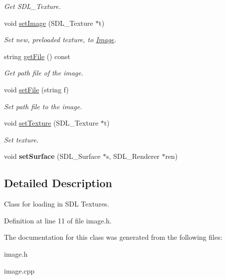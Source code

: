 \begin{DoxyCompactItemize}
\begin{DoxyCompactList}\small\item\em Get S\+D\+L\+\_\+\+Texture. \end{DoxyCompactList}\item 
void \hyperlink{classImage_af42b5d6a8abd90d67e9ae19e374520da}{set\+Image} (S\+D\+L\+\_\+\+Texture $\ast$t)\hypertarget{classImage_af42b5d6a8abd90d67e9ae19e374520da}{}\label{classImage_af42b5d6a8abd90d67e9ae19e374520da}

\begin{DoxyCompactList}\small\item\em Set new, preloaded texture, to \hyperlink{classImage}{Image}. \end{DoxyCompactList}\item 
string \hyperlink{classImage_aebc4cdd98961289324e6159b77ee3e69}{get\+File} () const \hypertarget{classImage_aebc4cdd98961289324e6159b77ee3e69}{}\label{classImage_aebc4cdd98961289324e6159b77ee3e69}

\begin{DoxyCompactList}\small\item\em Get path file of the image. \end{DoxyCompactList}\item 
void \hyperlink{classImage_ab4030489c65a25b2e0c458acac0ca94e}{set\+File} (string f)\hypertarget{classImage_ab4030489c65a25b2e0c458acac0ca94e}{}\label{classImage_ab4030489c65a25b2e0c458acac0ca94e}

\begin{DoxyCompactList}\small\item\em Set path file to the image. \end{DoxyCompactList}\item 
void \hyperlink{classImage_a64fb847a42f4553c6e4a652107fb997b}{set\+Texture} (S\+D\+L\+\_\+\+Texture $\ast$t)\hypertarget{classImage_a64fb847a42f4553c6e4a652107fb997b}{}\label{classImage_a64fb847a42f4553c6e4a652107fb997b}

\begin{DoxyCompactList}\small\item\em Set texture. \end{DoxyCompactList}\item 
void {\bfseries set\+Surface} (S\+D\+L\+\_\+\+Surface $\ast$s, S\+D\+L\+\_\+\+Renderer $\ast$ren)\hypertarget{classImage_acde2a6581da25188360a07d5da4c419b}{}\label{classImage_acde2a6581da25188360a07d5da4c419b}

\end{DoxyCompactItemize}


\subsection{Detailed Description}
Class for loading in S\+DL Textures. 

Definition at line 11 of file image.\+h.



The documentation for this class was generated from the following files\+:\begin{DoxyCompactItemize}
\item 
image.\+h\item 
image.\+cpp\end{DoxyCompactItemize}
